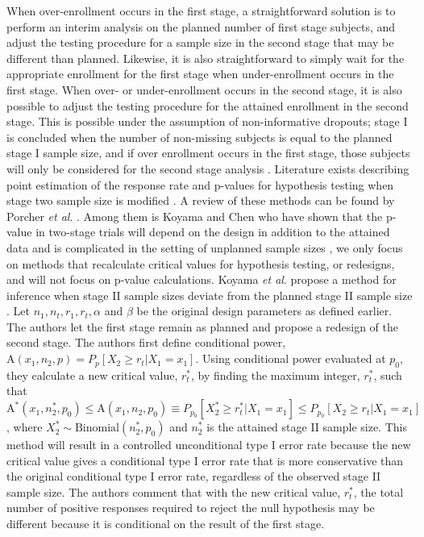 \documentclass[12pt]{report}\usepackage[]{graphicx}\usepackage[]{color}
\newlength{\li}\setlength{\li}{14.48pt}
\newlength{\di}\setlength{\di}{-3.5mm}
\begin{document}
When over-enrollment occurs in the first stage, a straightforward solution is to perform an interim analysis on the planned number of first stage subjects, and adjust the testing procedure for a sample size in the second stage that may be different than planned. Likewise, it is also straightforward to simply wait for the appropriate enrollment for the first stage when under-enrollment occurs in the first stage. When over- or under-enrollment occurs in the second stage, it is also possible to adjust the testing procedure for the attained enrollment in the second stage.  This is possible under the assumption of non-informative dropouts; stage I is concluded when the number of non-missing subjects is equal to the planned stage I sample size, and if over enrollment occurs in the first stage, those subjects will only be considered for the second stage analysis \cite{Koyama}. Literature exists describing point estimation of the response rate and p-values for hypothesis testing when stage two sample size is modified \cite{Whitehead}\cite{Changpoint}\cite{Guo}\cite{Jungest}\cite{Tsai}\cite{Jungpvalue}\cite{Koyama}. A review of these methods can be found by Porcher \textit{et al}. \cite{Porcher}. Among them is Koyama and Chen who have shown that the p-value in two-stage trials will depend on the design in addition to the attained data and is complicated in the setting of unplanned sample sizes \cite{Koyama}, we only focus on methods that recalculate critical values for hypothesis testing, or redesigns, and will not focus on p-value calculations. Koyama \textit{et al}. propose a method for inference when stage II sample sizes deviate from the planned stage II sample size \cite{Koyama}. Let $n_1, n_t, r_1, r_t, \alpha$ and $\beta$ be the original design parameters as defined earlier. The authors let the first stage remain as planned and propose a redesign of the second stage. The authors first define conditional power, $\mbox{A}(x_1, n_2, p) = P_p[X_2 \geq r_t | X_1 = x_1].$ Using conditional power evaluated at $p_0$, they calculate a new critical value, $r_t^\ast$, by finding the maximum integer, $r_t^\ast$, such that $\mbox{A}^\ast(x_1, n_2^\ast, p_0) \leq \mbox{A}(x_1, n_2, p_0) \equiv P_{p_0}[X_2^\ast \geq r_t^\ast | X_1 = x_1] \leq P_{p_0}[X_2 \geq r_t | X_1 = x_1]$, where $X_2^\ast \sim \mbox{Binomial}(n_2^\ast, p_0)$ and $n_2^\ast$ is the attained stage II sample size. This method will result in a controlled unconditional type I error rate because the new critical value gives a conditional type I error rate that is more conservative than the original conditional type I error rate, regardless of the observed stage II sample size. The authors comment that with the new critical value, $r_t^\ast$, the total number of positive responses required to reject the null hypothesis may be different because it is conditional on the result of the first stage. \\
\end{document}
